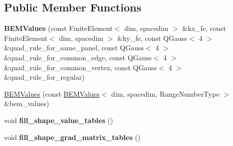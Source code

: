 \subsection*{Public Member Functions}
\begin{DoxyCompactItemize}
\item 
\mbox{\label{classLaplaceBEM_1_1BEMValues_a7095a2e5448fa5478cc2d9affe319abf}} 
{\bfseries B\+E\+M\+Values} (const Finite\+Element$<$ dim, spacedim $>$ \&kx\+\_\+fe, const Finite\+Element$<$ dim, spacedim $>$ \&ky\+\_\+fe, const Q\+Gauss$<$ 4 $>$ \&quad\+\_\+rule\+\_\+for\+\_\+same\+\_\+panel, const Q\+Gauss$<$ 4 $>$ \&quad\+\_\+rule\+\_\+for\+\_\+common\+\_\+edge, const Q\+Gauss$<$ 4 $>$ \&quad\+\_\+rule\+\_\+for\+\_\+common\+\_\+vertex, const Q\+Gauss$<$ 4 $>$ \&quad\+\_\+rule\+\_\+for\+\_\+regular)
\item 
\hyperlink{classLaplaceBEM_1_1BEMValues_ac40a849631e782f840a927e68bc2f9f6}{B\+E\+M\+Values} (const \hyperlink{classLaplaceBEM_1_1BEMValues}{B\+E\+M\+Values}$<$ dim, spacedim, Range\+Number\+Type $>$ \&bem\+\_\+values)
\item 
\mbox{\label{classLaplaceBEM_1_1BEMValues_a3fd86680a51e688d003d5a0bfe09629f}} 
void {\bfseries fill\+\_\+shape\+\_\+value\+\_\+tables} ()
\item 
\mbox{\label{classLaplaceBEM_1_1BEMValues_a5383d5eb891f8cd742584e95aad976c8}} 
void {\bfseries fill\+\_\+shape\+\_\+grad\+\_\+matrix\+\_\+tables} ()
\end{DoxyCompactItemize}
